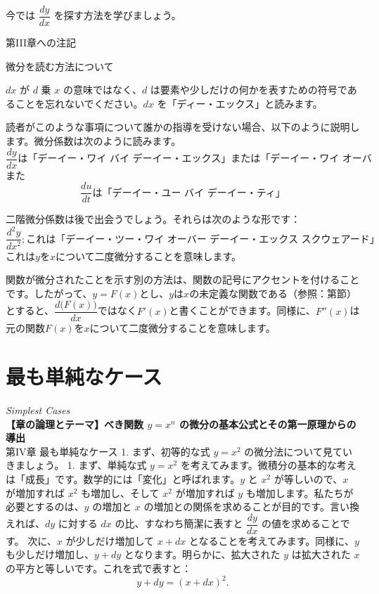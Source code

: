 \documentclass[a4paper,11pt,openany]{ltjsbook}
\begin{document}
今では \( \dfrac{dy}{dx} \) を探す方法を学びましょう。

第III章への注記

微分を読む方法について

\( dx \) が \( d \) 乗 \( x \) の意味ではなく、\( d \) は要素や少しだけの何かを表すための符号であることを忘れないでください。\( dx \) を「ディー・エックス」と読みます。

読者がこのような事項について誰かの指導を受けない場合、以下のように説明します。微分係数は次のように読みます。
\[
\dfrac{dy}{dx} \text{は「デーイー・ワイ バイ デーイー・エックス」または「デーイー・ワイ オーバー デーイー・エックス」と読みます。}
\]
また
\[
\dfrac{du}{dt} \text{は「デーイー・ユー バイ デーイー・ティ」}
\]

二階微分係数は後で出会うでしょう。それらは次のような形です：
\[
\dfrac{d^2 y}{dx^2}; \text{これは「デーイー・ツー・ワイ オーバー デーイー・エックス スクウェアード」と読み、}
\]
これは$y$を$x$について二度微分することを意味します。

関数が微分されたことを示す別の方法は、関数の記号にアクセントを付けることです。したがって、$y=F(x)$とし、$y$は$x$の未定義な関数である（参照：第\pageref{function}節）とすると、$\dfrac{d\bigl(F(x)\bigr)}{dx}$ではなく$F'(x)$と書くことができます。同様に、$F''(x)$は元の関数$F(x)$を$x$について二度微分することを意味します。



\chapter{最も単純なケース}
\noindent\textit{\large Simplest Cases}\\[2mm]
\noindent\textbf{\small 【章の論理とテーマ】べき関数 $y = x^n$ の微分の基本公式とその第一原理からの導出}\\[4mm]
第IV章 最も単純なケース
1. まず、初等的な式 \( y = x^2 \) の微分法について見ていきましょう。
1. まず、単純な式 \( y = x^2 \) を考えてみます。微積分の基本的な考えは「成長」です。数学的には「変化」と呼ばれます。\( y \) と \( x^2 \) が等しいので、\( x \) が増加すれば \( x^2 \) も増加し、そして \( x^2 \) が増加すれば \( y \) も増加します。私たちが必要とするのは、\( y \) の増加と \( x \) の増加との関係を求めることが目的です。言い換えれば、\( dy \) に対する \( dx \) の比、すなわち簡潔に表すと \( \dfrac{dy}{dx} \) の値を求めることです。
次に、\( x \) が少しだけ増加して \( x + dx \) となることを考えてみます。同様に、\( y \) も少しだけ増加し、\( y + dy \) となります。明らかに、拡大された \( y \) は拡大された \( x \) の平方と等しいです。これを式で表すと：
\[
y + dy = (x + dx)^2.
\]
\end{document}
